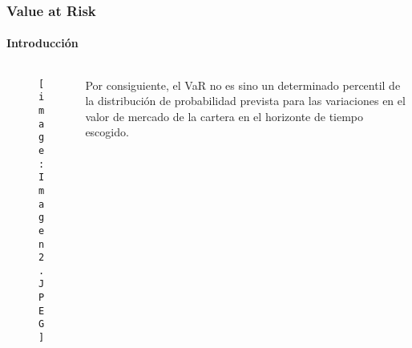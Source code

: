\documentclass[aspectratio=169]{beamer}
\begin{document}
\begin{frame}
\frametitle{Value at Risk}
\framesubtitle{Introducción}



\begin{columns}
\begin{column}{0.5\textwidth}

\begin{figure}[h!]
\begin{center}
    \texttt{[image: Imagen2.JPEG]}
\end{center}
\end{figure}



\end{column}
\begin{column}{0.5\textwidth}  %

Por consiguiente, el VaR no es sino un determinado percentil de la distribución de probabilidad prevista para las variaciones en el valor de mercado de la cartera en el horizonte de tiempo escogido.

\end{column}
\end{columns}




\end{frame}



\end{document}
